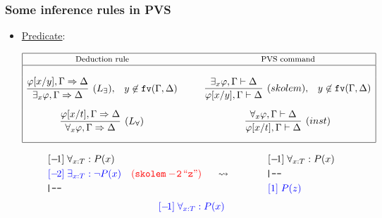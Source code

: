\documentclass[10pt]{beamer}
\newcommand{\pseq}{\mbox{{\tt |---}\;}}
\newcommand{\fv}[1]{{\tt fv}(#1)}
\begin{document}
\begin{frame}
\frametitle{Some inference rules in PVS}

 	\begin{itemize}
		\item \underline{{\color{blue}Predicate}}:
{\scriptsize
\begin{table}
\vspace{-7mm}
\[\begin{array}{|c@{\hspace{1cm}}c|}
\hline
\mbox{\footnotesize Deduction rule} & \mbox{\footnotesize PVS command} \\
\hline
&\\
\infer[(L_\exists),\;\;\;y\not\in \fv{\Gamma,\Delta}]{\exists_x\varphi,\Gamma\Rightarrow\Delta}{\varphi[x/y],\Gamma\Rightarrow\Delta} & 
\infer[(skolem),\;\;\;y\not\in \fv{\Gamma,\Delta}]{\varphi[x/y],\Gamma\vdash\Delta}{\exists_x\varphi,\Gamma\vdash\Delta} \\[3mm]
\infer[(L_\forall)]{\forall_x \varphi, \Gamma\Rightarrow\Delta}{\varphi[x/t],\Gamma\Rightarrow\Delta} & 
\infer[(inst)]{\varphi[x/t],\Gamma\vdash\Delta}{\forall_x \varphi, \Gamma\vdash\Delta}\\[3mm]
\hline
\end{array}\]
\end{table}
}
{\small	
\[\begin{array}{l}
    \,[-\!1]\; \forall_{x:T} : P(x)  \\[1mm]
    \,{\color{blue}[-\!2]\;    \exists_{x:T} : \neg P(x)} \\[1mm]
    \pseq 
  \end{array}         
  \begin{array}{c}{\color{red}{\tt (skolem -\! 2 \,``z")} } \hspace{.5cm} \rightsquigarrow \end{array} \hspace{1cm}
  \begin{array}{l}
    \,[-\!1]\; \forall_{x:T} : P(x)  \\[1mm]
    \pseq \\[1mm]
    \,{\color{blue}[1]\; P(z)} \\
  \end{array}         
  \]
\hrulefill
\[ \begin{array}{l}
    \,{\color{blue}[-\!1]\; \forall_{x:T} : P(x) } \\[1mm]

\end{array}\]}
\end{itemize}
\end{frame}
\end{document}
